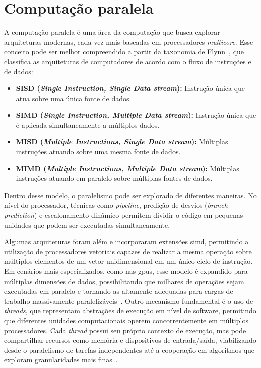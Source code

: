 \section{Computação paralela}\label{sec:compParalela}

A computação paralela é uma área da computação que busca explorar arquiteturas modernas, cada vez mais baseadas em processadores \textit{multicore}. Esse conceito pode ser melhor compreendido a partir da taxonomia de Flynn~\cite{flynn1972}, que classifica as arquiteturas de computadores de acordo com o fluxo de instruções e de dados:

\begin{itemize}
    \item \textbf{SISD (\textit{Single Instruction, Single Data stream}):} Instrução única que atua sobre uma única fonte de dados.
    \item \textbf{SIMD (\textit{Single Instruction, Multiple Data stream}):} Instrução única que é aplicada simultaneamente a múltiplos dados.
    \item \textbf{MISD (\textit{Multiple Instructions, Single Data stream}):} Múltiplas instruções atuando sobre uma mesma fonte de dados.
    \item \textbf{MIMD (\textit{Multiple Instructions, Multiple Data stream}):} Múltiplas instruções atuando em paralelo sobre múltiplas fontes de dados.
\end{itemize}

Dentro desse modelo, o paralelismo pode ser explorado de diferentes maneiras. No nível do processador, técnicas como \textit{pipeline}, predição de desvios (\textit{branch prediction}) e escalonamento dinâmico permitem dividir o código em pequenas unidades que podem ser executadas simultaneamente.

Algumas arquiteturas foram além e incorporaram extensões \gls{simd}, permitindo a utilização de processadores vetoriais capazes de realizar a mesma operação sobre múltiplos elementos de um vetor unidimensional em um único ciclo de instrução. Em cenários mais especializados, como nas \glspl{gpu}, esse modelo é expandido para múltiplas dimensões de dados, possibilitando que milhares de operações sejam executadas em paralelo e tornando-as altamente adequadas para cargas de trabalho massivamente paralelizáveis~\cite{hennessy2017}. Outro mecanismo fundamental é o uso de \textit{threads}, que representam abstrações de execução em nível de software, permitindo que diferentes unidades computacionais operem concorrentemente em múltiplos processadores. Cada \textit{thread} possui seu próprio contexto de execução, mas pode compartilhar recursos como memória e dispositivos de entrada/saída, viabilizando desde o paralelismo de tarefas independentes até a cooperação em algoritmos que exploram granularidades mais finas~\cite{tanenbaum2015,hennessy2017}.


